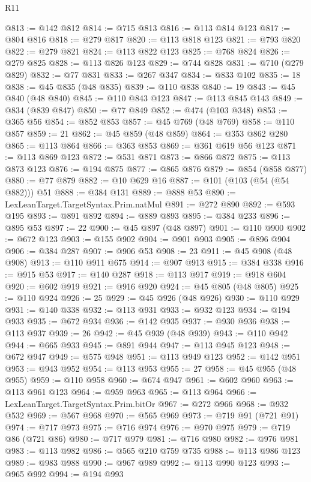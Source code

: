 \begin{lexlean}{R11}
\begin{coremodule}
{{{{{{{{{{{{{{{{{{{{{{{{{{{{{{{{{{{{{{{{{{{{{{{{{{{{{{{{{{{{{{{{{{{{{{{{{{{{{{{{{{{{{{{{{{{{{{{{{{{{{{{{{{@813 := @142 @812
@814 := @715 @813
@816 := @113 @814 @123
@817 := @804 @816
@818 := @279 @817
@820 := @113 @818 @123
@821 := @793 @820
@822 := @279 @821
@824 := @113 @822 @123
@825 := @768 @824
@826 := @279 @825
@828 := @113 @826 @123
@829 := @744 @828
@831 := @710 (@279 @829)
@832 := @77 @831
@833 := @267 @347
@834 := @833 @102
@835 := 18
@838 := @45 @835 (@48 @835)
@839 := @110 @838
@840 := 19
@843 := @45 @840 (@48 @840)
@845 := @110 @843 @123
@847 := @113 @845 @143
@849 := @834 (@839 @847)
@850 := @77 @849
@852 := @474 (@103 @348)
@853 := @365 @56
@854 := @852 @853
@857 := @45 @769 (@48 @769)
@858 := @110 @857
@859 := 21
@862 := @45 @859 (@48 @859)
@864 := @353 @862 @280
@865 := @113 @864
@866 := @363 @853
@869 := @361 @619 @56 @123
@871 := @113 @869 @123
@872 := @531 @871
@873 := @866 @872
@875 := @113 @873 @123
@876 := @194 @875
@877 := @865 @876
@879 := @854 (@858 @877)
@880 := @77 @879
@882 := @10 @629 @16
@887 := @101 (@103 (@54 (@54 @882))) @51
@888 := @384 @131
@889 := @888 @53
@890 := LexLeanTarget.TargetSyntax.Prim.natMul
@891 := @272 @890
@892 := @593 @195
@893 := @891 @892
@894 := @889 @893
@895 := @384 @233
@896 := @895 @53
@897 := 22
@900 := @45 @897 (@48 @897)
@901 := @110 @900
@902 := @672 @123
@903 := @155 @902
@904 := @901 @903
@905 := @896 @904
@906 := @384 @287
@907 := @906 @53
@908 := 23
@911 := @45 @908 (@48 @908)
@913 := @110 @911 @675
@914 := @907 @913
@915 := @384 @338
@916 := @915 @53
@917 := @140 @287
@918 := @113 @917
@919 := @918 @604
@920 := @602 @919
@921 := @916 @920
@924 := @45 @805 (@48 @805)
@925 := @110 @924
@926 := 25
@929 := @45 @926 (@48 @926)
@930 := @110 @929
@931 := @140 @338
@932 := @113 @931
@933 := @932 @123
@934 := @194 @933
@935 := @672 @934
@936 := @142 @935
@937 := @930 @936
@938 := @113 @937
@939 := 26
@942 := @45 @939 (@48 @939)
@943 := @110 @942
@944 := @665 @933
@945 := @891 @944
@947 := @113 @945 @123
@948 := @672 @947
@949 := @575 @948
@951 := @113 @949 @123
@952 := @142 @951
@953 := @943 @952
@954 := @113 @953
@955 := 27
@958 := @45 @955 (@48 @955)
@959 := @110 @958
@960 := @674 @947
@961 := @602 @960
@963 := @113 @961 @123
@964 := @959 @963
@965 := @113 @964
@966 := LexLeanTarget.TargetSyntax.Prim.bitOr
@967 := @272 @966
@968 := @932 @532
@969 := @567 @968
@970 := @565 @969
@973 := @719 @91 (@721 @91)
@974 := @717 @973
@975 := @716 @974
@976 := @970 @975
@979 := @719 @86 (@721 @86)
@980 := @717 @979
@981 := @716 @980
@982 := @976 @981
@983 := @113 @982
@986 := @565 @210 @759 @735
@988 := @113 @986 @123
@989 := @983 @988
@990 := @967 @989
@992 := @113 @990 @123
@993 := @965 @992
@994 := @194 @993
}}}}}}}}}}}}}}}}}}}}}}}}}}}}}}}}}}}}}}}}}}}}}}}}}}}}}}}}}}}}}}}}}}}}}}}}}}}}}}}}}}}}}}}}}}}}}}}}}}}}}}}}}}
\end{coremodule}
\end{lexlean}
